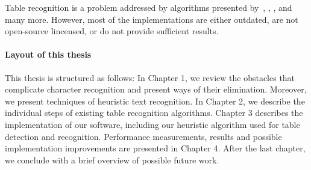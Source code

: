 Table recognition is a problem addressed by algorithms presented by~\citet{tableDetHeterogeneous}, \citet{TRecs}, \citet{MediumTable}, \citet{pdf2table} and many more. However, most of the implementations are either outdated, are not open-source lincensed, or do not provide sufficient results.

\paragraph{Layout of this thesis} This thesis is structured as follows: In Chapter 1, we review the obstacles that complicate character recognition and present ways of their elimination. Moreover, we present techniques of heuristic text recognition. In Chapter 2, we describe the individual steps of existing table recognition algorithms. Chapter 3 describes the implementation of our software, including our heuristic algorithm used for table detection and recognition. Performance measurements, results and possible implementation improvements are presented in Chapter 4. After the last chapter, we conclude with a brief overview of possible future work.

